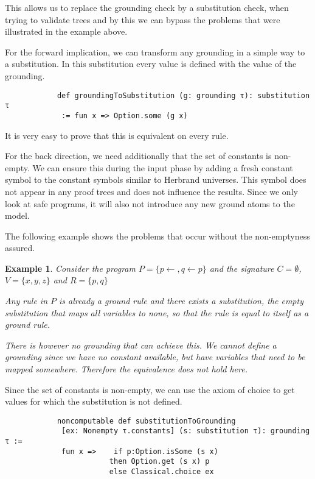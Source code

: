 \documentclass{article}
\newtheorem{example}{Example}
\begin{document}
            This allows us to replace the grounding check by a substitution check, when trying to validate trees and by this we can bypass the problems that were illustrated in the example above. 

            For the forward implication, we can transform any grounding in a simple way to a substitution. In this substitution every value is defined with the value of the grounding.

            \begin{lstlisting}
            def groundingToSubstitution (g: grounding τ): substitution τ
             := fun x => Option.some (g x)
            \end{lstlisting}

            It is very easy to prove that this is equivalent on every rule.

            For the back direction, we need additionally that the set of constants is non-empty. We can ensure this during the input phase by adding a fresh constant symbol to the constant symbols similar to Herbrand universes. This symbol does not appear in any proof trees and does not influence the results. Since we only look at safe programs, it will also not introduce any new ground atoms to the model.

            The following example shows the problems that occur without the non-emptyness assured.

            \begin{example}
                Consider the program $P= \{p \leftarrow, q \leftarrow p\}$ and the signature $C = \emptyset$, $V = \{x,y,z \}$ and $R = \{p,q\}$

                Any rule in $P$ is already a ground rule and there exists a substitution, the empty substitution that maps all variables to none, so that the rule is equal to itself as a ground rule.
                
                There is however no grounding that can achieve this. We cannot define a grounding since we have no constant available, but have variables that need to be mapped somewhere. Therefore the equivalence does not hold here.
            \end{example}

            Since the set of constants is non-empty, we can use the axiom of choice to get values for which the substitution is not defined.

            \begin{lstlisting}
            noncomputable def substitutionToGrounding 
             [ex: Nonempty τ.constants] (s: substitution τ): grounding τ := 
             fun x =>    if p:Option.isSome (s x) 
                        then Option.get (s x) p 
                        else Classical.choice ex

            \end{lstlisting}
\end{document}

